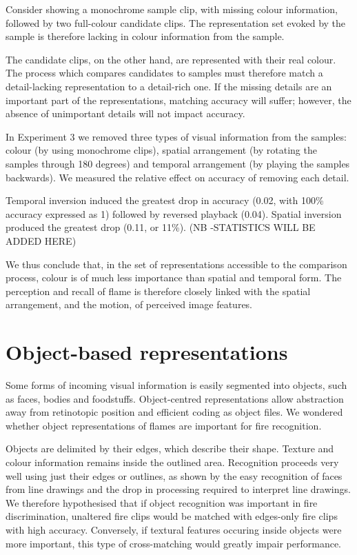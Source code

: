 \documentclass[a4paper]{article}
\begin{document}
Consider showing a monochrome sample clip, with missing colour information, followed by two full-colour candidate clips. The representation set evoked by the sample is therefore lacking in colour information from the sample.

The candidate clips, on the other hand, are represented with their real colour. The process which compares candidates to samples must therefore match a detail-lacking representation to a detail-rich one. If the missing details are an important part of the representations, matching accuracy will suffer; however, the absence of unimportant details will not impact accuracy.

In Experiment 3 we removed three types of visual information from the samples: colour (by using monochrome clips), spatial arrangement (by rotating the samples through 180 degrees) and temporal arrangement (by playing the samples backwards). We measured the relative effect on accuracy of removing each detail.

Temporal inversion induced the greatest drop in accuracy (0.02, with 100\% accuracy expressed as 1) followed by reversed playback (0.04). Spatial inversion produced the greatest drop (0.11, or 11\%). (NB -STATISTICS WILL BE ADDED HERE)

We thus conclude that, in the set of representations accessible to the comparison process, colour is of much less importance than spatial and temporal form. The perception and recall of flame is therefore closely linked with the spatial arrangement, and the motion, of perceived image features.

\section{Object-based representations}

Some forms of incoming visual information is easily segmented into objects, such as faces, bodies and foodstuffs\cite{kriegeskorte2008matching}. Object-centred representations allow abstraction away from retinotopic position\cite{pasupathy2001shape} and efficient coding as object files\cite{treisman1993perception,kahneman1992reviewing}. We wondered whether object representations of flames are important for fire recognition. 

Objects are delimited by their edges, which describe their shape. Texture and colour information remains inside the outlined area. Recognition proceeds very well using just their edges or outlines, as shown by the easy recognition of faces from line drawings\cite{bruce1992importance} and the drop in processing required to interpret line drawings\cite{leder1996line}. We therefore hypothesised that if object recognition was important in fire discrimination, unaltered fire clips would be matched with edges-only fire clips with high accuracy. Conversely, if textural features occuring inside objects were more important, this type of cross-matching would greatly impair performance.
\end{document}
